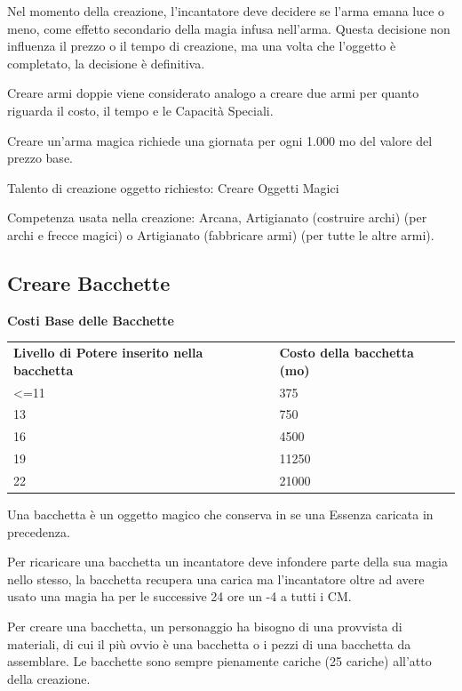\documentclass[a4paper,11pt,twoside,openany]{book}
\begin{document}
Nel momento della creazione, l'incantatore deve decidere se l'arma emana luce o meno, come effetto secondario della magia infusa nell'arma. Questa decisione non influenza il prezzo o il tempo di creazione, ma una volta che l'oggetto è completato, la decisione è definitiva.

Creare armi doppie viene considerato analogo a creare due armi per quanto riguarda il costo, il tempo e le Capacità Speciali.

Creare un'arma magica richiede una giornata per ogni 1.000 mo del valore del prezzo base.

Talento di creazione oggetto richiesto: Creare Oggetti Magici

Competenza usata nella creazione: Arcana, Artigianato (costruire archi) (per archi e frecce magici) o Artigianato (fabbricare armi) (per tutte le altre armi).

\subsection{Creare Bacchette}

\bigskip

\textbf{Costi Base delle Bacchette}

\begin{tabular}{ll}
	\toprule
	\textbf{Livello di Potere inserito nella bacchetta} & \textbf{Costo della bacchetta (mo)}\\
	\textless=11        & 375\\
	13  & 750\\
	16  & 4500\\
	19  & 11250\\
	22  & 21000\\
\end{tabular}

\bigskip

Una bacchetta è un oggetto magico che conserva in se una Essenza caricata in precedenza.

Per ricaricare una bacchetta un incantatore deve infondere parte della sua magia nello stesso, la bacchetta recupera una carica ma l'incantatore oltre ad avere usato una magia ha per le successive 24 ore un -4 a tutti i CM.

Per creare una bacchetta, un personaggio ha bisogno di una provvista di materiali, di cui il più ovvio è una bacchetta o i pezzi di una bacchetta da assemblare. Le bacchette sono sempre pienamente cariche (25 cariche) all'atto della creazione.
\end{document}
